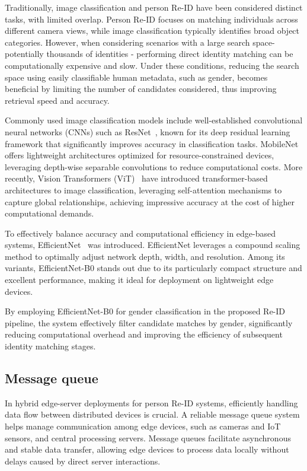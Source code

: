 \documentclass[../main.tex]{subfiles}
\begin{document}
Traditionally, image classification and person Re-ID have been considered distinct tasks, with limited overlap. Person Re-ID focuses on matching individuals across different camera views, while image classification typically identifies broad object categories. However, when considering scenarios with a large search space-potentially thousands of identities - performing direct identity matching can be computationally expensive and slow. Under these conditions, reducing the search space using easily classifiable human metadata, such as gender, becomes beneficial by limiting the number of candidates considered, thus improving retrieval speed and accuracy.

Commonly used image classification models include well-established convolutional neural networks (CNNs) such as ResNet~\cite{he2015deepresiduallearningimage}, known for its deep residual learning framework that significantly improves accuracy in classification tasks. MobileNet~\cite{mobilenet} offers lightweight architectures optimized for resource-constrained devices, leveraging depth-wise separable convolutions to reduce computational costs. More recently, Vision Transformers (ViT)~\cite{ViT} have introduced transformer-based architectures to image classification, leveraging self-attention mechanisms to capture global relationships, achieving impressive accuracy at the cost of higher computational demands.

To effectively balance accuracy and computational efficiency in edge-based systems, EfficientNet~\cite{efficientnet} was introduced. EfficientNet leverages a compound scaling method to optimally adjust network depth, width, and resolution. Among its variants, EfficientNet-B0 stands out due to its particularly compact structure and excellent performance, making it ideal for deployment on lightweight edge devices. 

By employing EfficientNet-B0 for gender classification in the proposed Re-ID pipeline, the system effectively filter candidate matches by gender, significantly reducing computational overhead and improving the efficiency of subsequent identity matching stages.


\subsection{Message queue}
\label{sec:message_queue}

In hybrid edge-server deployments for person Re-ID systems, efficiently handling data flow between distributed devices is crucial. A reliable message queue system helps manage communication among edge devices, such as cameras and IoT sensors, and central processing servers. Message queues facilitate asynchronous and stable data transfer, allowing edge devices to process data locally without delays caused by direct server interactions.
\end{document}
